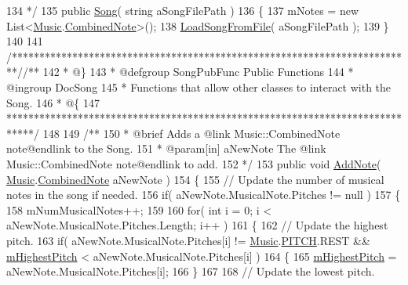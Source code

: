 \begin{DoxyCodeInclude}
134 \textcolor{comment}{    */}
135     \textcolor{keyword}{public} \hyperlink{group___song_construct_gae2e6486a6a2f523b7c81de472d761ff5}{Song}( \textcolor{keywordtype}{string} aSongFilePath )
136     \{
137         mNotes = \textcolor{keyword}{new} List<\hyperlink{class_music}{Music}.\hyperlink{group___music_structs_struct_music_1_1_combined_note}{CombinedNote}>();
138         \hyperlink{group___song_priv_func_ga5c8edd8f7ebeab0d93f5619a644c30f5}{LoadSongFromFile}( aSongFilePath );
139     \}
140 
141     \textcolor{comment}{/*************************************************************************/}\textcolor{comment}{/** }
142 \textcolor{comment}{     * @\}}
143 \textcolor{comment}{     * @defgroup SongPubFunc Public Functions}
144 \textcolor{comment}{     * @ingroup DocSong}
145 \textcolor{comment}{     * Functions that allow other classes to interact with the Song.}
146 \textcolor{comment}{     * @\{}
147 \textcolor{comment}{    *****************************************************************************/}
148 \textcolor{comment}{}
149 \textcolor{comment}{    /** }
150 \textcolor{comment}{     * @brief Adds a @link Music::CombinedNote note@endlink to the Song.}
151 \textcolor{comment}{     * @param[in] aNewNote The @link Music::CombinedNote note@endlink to add.}
152 \textcolor{comment}{    */}
153     \textcolor{keyword}{public} \textcolor{keywordtype}{void} \hyperlink{group___song_pub_func_gab7c8fe4dc29f5ae7b7728c583fe51f7e}{AddNote}( \hyperlink{class_music}{Music}.\hyperlink{group___music_structs_struct_music_1_1_combined_note}{CombinedNote} aNewNote )
154     \{
155         \textcolor{comment}{// Update the number of musical notes in the song if needed.}
156         \textcolor{keywordflow}{if}( aNewNote.MusicalNote.Pitches != null )
157         \{
158             mNumMusicalNotes++;
159 
160             \textcolor{keywordflow}{for}( \textcolor{keywordtype}{int} i = 0; i < aNewNote.MusicalNote.Pitches.Length; i++ )
161             \{
162                 \textcolor{comment}{// Update the highest pitch.}
163                 \textcolor{keywordflow}{if}( aNewNote.MusicalNote.Pitches[i] != \hyperlink{class_music}{Music}.\hyperlink{group___music_enums_ga508f69b199ea518f935486c990edac1d}{PITCH}.REST && 
      \hyperlink{group___song_priv_var_ga2dcd39d9add609e9df56a94057441dcc}{mHighestPitch} < aNewNote.MusicalNote.Pitches[i] )
164                 \{
165                     \hyperlink{group___song_priv_var_ga2dcd39d9add609e9df56a94057441dcc}{mHighestPitch} = aNewNote.MusicalNote.Pitches[i];
166                 \}
167 
168                 \textcolor{comment}{// Update the lowest pitch.}

\end{DoxyCodeInclude}
